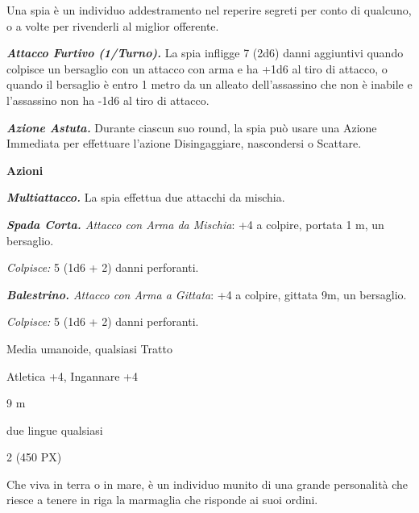 \begin{multicols}{2}
{Una spia è un individuo addestramento nel reperire segreti per conto di qualcuno, o a volte per rivenderli al miglior offerente.

\emph{\textbf{Attacco Furtivo (1/Turno).}} La spia infligge 7 (2d6) danni aggiuntivi quando colpisce un bersaglio con un attacco con arma e ha +1d6 al tiro di attacco, o quando il bersaglio è entro 1 metro da un alleato dell'assassino che non è inabile e l'assassino non ha -1d6 al tiro di attacco.

\emph{\textbf{Azione Astuta.}} Durante ciascun suo round, la spia può usare una Azione Immediata per effettuare l'azione Disingaggiare, nascondersi o Scattare.

\textbf{Azioni}

\emph{\textbf{Multiattacco.}} La spia effettua due attacchi da mischia.

\emph{\textbf{Spada Corta.} Attacco con Arma da Mischia}: +4 a colpire, portata 1 m, un bersaglio.

\emph{Colpisce:} 5 (1d6 + 2) danni perforanti.

\emph{\textbf{Balestrino.} Attacco con Arma a Gittata}: +4 a colpire, gittata 9m, un bersaglio.

\emph{Colpisce:} 5 (1d6 + 2) danni perforanti.

\begin{description}[noitemsep, topsep=0pt, parsep=0pt, partopsep=0pt, itemsep=1pt, leftmargin=2.35cm,  labelwidth=2.2cm, itemindent=0cm, listparindent=0pt] %
\setlength{\baselineskip}{10pt}
\item[\textbf{Taglia/Tipo}] Media umanoide, qualsiasi Tratto
\item[\textbf{Caratt.}] 
\item[\textbf{Punti Ferita}] 
\item[\textbf{Comp.}] Atletica +4, Ingannare +4
\item[\textbf{Tiri Salvez.}] 
\item[\textbf{Movimento}] 9 m
\item[\textbf{Linguaggi}] due lingue qualsiasi
\item[\textbf{Sfida}] 2 (450 PX)
\end{description}
\smallskip

Che viva in terra o in mare, è un individuo munito di una grande personalità che riesce a tenere in riga la marmaglia che risponde ai suoi ordini.

}
\end{multicols}
